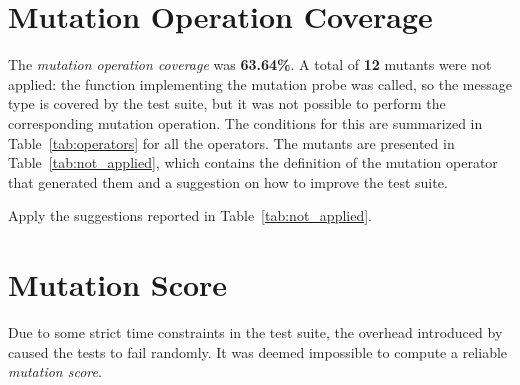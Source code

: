 \section{Mutation Operation Coverage}

The \emph{mutation operation coverage} was \textbf{63.64\%}. A total of \textbf{12} mutants were not applied: the function implementing the mutation probe was called, so the message type is covered by the test suite, but it was not possible to perform the corresponding mutation operation.
The conditions for this are summarized in Table~\ref{tab:operators} for all the operators.
The mutants are presented in Table~\ref{tab:not_applied}, which contains the definition of the mutation operator that generated them and a suggestion on how to improve the test suite.

\action Apply the suggestions reported in Table~\ref{tab:not_applied}.

 


\section{Mutation Score}

 Due to some strict time constraints in the test suite, the overhead introduced by \DAMA caused the tests to fail randomly. It was deemed impossible to compute a reliable \emph{mutation score}.
